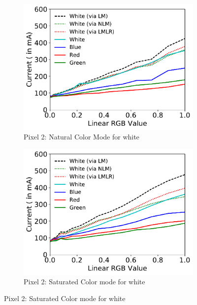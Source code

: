 
\begin{figure}[tp]
	\begin{subfigure}[]{0.31\textwidth}
		\includegraphics[width=\textwidth]{./figure/1602_P2_Natural_White.pdf}
		\caption{Pixel 2: Natural Color Mode for white}
		\label{fig:initial_evaluation_2_n6_w_c}
	\end{subfigure}
	\hfill
	\begin{subfigure}[]{0.31\textwidth}
		\includegraphics[width=\textwidth]{./figure/1600_P2_Saturated_White.pdf}
		\caption{Pixel 2: Saturated Color mode for white}

\end{subfigure}
\end{figure}
